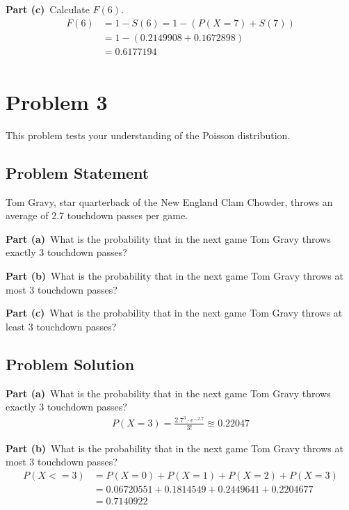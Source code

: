 \documentclass[12pt]{article}
\theoremstyle{definition}
\begin{document}
\vspace{4.5in}
{\bf Part (c)}\ Calculate $F(6)$.
\begin{align*}
F(6) &= 1 - S(6) = 1 - (P(X = 7) + S(7))\\
&= 1 - (0.2149908+ 0.1672898)\\
&= 0.6177194\\
\end{align*}




\newpage
\section*{Problem 3}

This problem tests your understanding of the Poisson distribution.

\subsection*{Problem Statement}

Tom Gravy, star quarterback of the New England Clam Chowder, throws an average of 2.7 touchdown passes per game.

\bigskip
\noindent
{\bf Part (a)}\ What is the probability that in the next game Tom Gravy throws exactly 3 touchdown passes?

\bigskip
\noindent
{\bf Part (b)}\ What is the probability that in the next game Tom Gravy throws at most 3 touchdown passes?

\bigskip
\noindent
{\bf Part (c)}\ What is the probability that in the next game Tom Gravy throws at least 3 touchdown passes?


\subsection*{Problem Solution}

\bigskip
\noindent
{\bf Part (a)}\ What is the probability that in the next game Tom Gravy throws exactly 3 touchdown passes?
\begin{align*}
P(X = 3) = \frac{2.7^3 \cdot e^{-2.7}}{3!} \approxeq 0.22047
\end{align*}

\newpage
\noindent
{\bf Part (b)}\ What is the probability that in the next game Tom Gravy throws at most 3 touchdown passes?
\begin{align*}
P(X <= 3) &= P(X = 0) + P(X = 1) + P(X = 2) + P(X = 3)\\
&= 0.06720551 + 0.1814549 + 0.2449641 + 0.2204677\\
&= 0.7140922\\
\end{align*}
\end{document}
